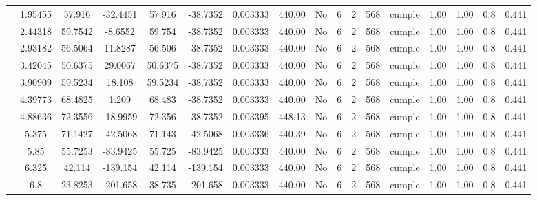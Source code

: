 \begin{table}[H]
{\begin{tabular}{|c|c|c|c|c|c|c|c|c|c|c|c|c|c|c|c|c|}
\cline{2-17}        & 1.95455 & 57.916 & -32.4451 & 57.916 & -38.7352 & 0.003333 & 440.00 & No  & 6   & 2   & 568 & \cellcolor[rgb]{ .776,  .937,  .808}cumple & 1.00 & 1.00 & 0.8 & 0.441 \bigstrut\\
\cline{2-17}        & 2.44318 & 59.7542 & -8.6552 & 59.754 & -38.7352 & 0.003333 & 440.00 & No  & 6   & 2   & 568 & \cellcolor[rgb]{ .776,  .937,  .808}cumple & 1.00 & 1.00 & 0.8 & 0.441 \bigstrut\\
\cline{2-17}        & 2.93182 & 56.5064 & 11.8287 & 56.506 & -38.7352 & 0.003333 & 440.00 & No  & 6   & 2   & 568 & \cellcolor[rgb]{ .776,  .937,  .808}cumple & 1.00 & 1.00 & 0.8 & 0.441 \bigstrut\\
\cline{2-17}        & 3.42045 & 50.6375 & 29.0067 & 50.6375 & -38.7352 & 0.003333 & 440.00 & No  & 6   & 2   & 568 & \cellcolor[rgb]{ .776,  .937,  .808}cumple & 1.00 & 1.00 & 0.8 & 0.441 \bigstrut\\
\cline{2-17}        & 3.90909 & 59.5234 & 18.108 & 59.5234 & -38.7352 & 0.003333 & 440.00 & No  & 6   & 2   & 568 & \cellcolor[rgb]{ .776,  .937,  .808}cumple & 1.00 & 1.00 & 0.8 & 0.441 \bigstrut\\
\cline{2-17}        & 4.39773 & 68.4825 & 1.209 & 68.483 & -38.7352 & 0.003333 & 440.00 & No  & 6   & 2   & 568 & \cellcolor[rgb]{ .776,  .937,  .808}cumple & 1.00 & 1.00 & 0.8 & 0.441 \bigstrut\\
\cline{2-17}        & 4.88636 & 72.3556 & -18.9959 & 72.356 & -38.7352 & 0.003395 & 448.13 & No  & 6   & 2   & 568 & \cellcolor[rgb]{ .776,  .937,  .808}cumple & 1.00 & 1.00 & 0.8 & 0.441 \bigstrut\\
\cline{2-17}        & 5.375 & 71.1427 & -42.5068 & 71.143 & -42.5068 & 0.003336 & 440.39 & No  & 6   & 2   & 568 & \cellcolor[rgb]{ .776,  .937,  .808}cumple & 1.00 & 1.00 & 0.8 & 0.441 \bigstrut\\
\cline{2-17}        & 5.85 & 55.7253 & -83.9425 & 55.725 & -83.9425 & 0.003333 & 440.00 & No  & 6   & 2   & 568 & \cellcolor[rgb]{ .776,  .937,  .808}cumple & 1.00 & 1.00 & 0.8 & 0.441 \bigstrut\\
\cline{2-17}        & 6.325 & 42.114 & -139.154 & 42.114 & -139.154 & 0.003333 & 440.00 & No  & 6   & 2   & 568 & \cellcolor[rgb]{ .776,  .937,  .808}cumple & 1.00 & 1.00 & 0.8 & 0.441 \bigstrut\\
\cline{2-17}        & 6.8 & 23.8253 & -201.658 & 38.735 & -201.658 & 0.003333 & 440.00 & No  & 6   & 2   & 568 & \cellcolor[rgb]{ .776,  .937,  .808}cumple & 1.00 & 1.00 & 0.8 & 0.441 \bigstrut\\

\end{tabular}}
\end{table}
